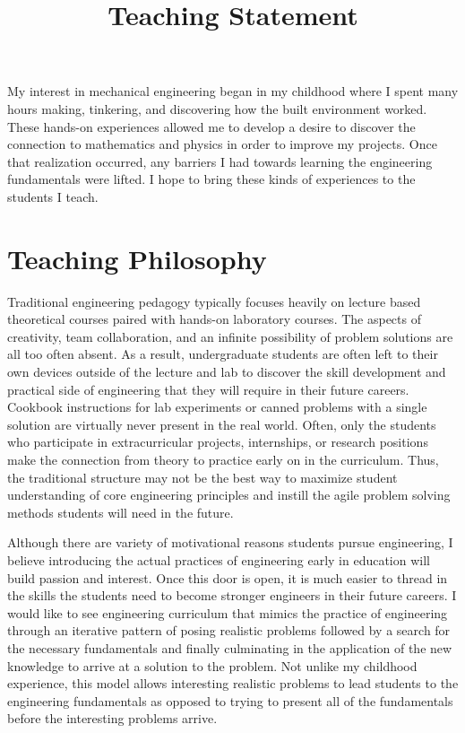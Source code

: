 \documentclass{article}
\title{Teaching Statement}
\date{}
\begin{document}
\maketitle

My interest in mechanical engineering began in my childhood where I spent many
hours making, tinkering, and discovering how the built environment worked.
These hands-on experiences allowed me to develop a desire to discover the
connection to mathematics and physics in order to improve my projects. Once
that realization occurred, any barriers I had towards learning the engineering
fundamentals were lifted. I hope to bring these kinds of experiences to the
students I teach.

\section*{Teaching Philosophy}
%
Traditional engineering pedagogy typically focuses heavily on lecture based
theoretical courses paired with hands-on laboratory courses. The aspects of
creativity, team collaboration, and an infinite possibility of problem
solutions are all too often absent. As a result, undergraduate students are
often left to their own devices outside of the lecture and lab to discover the
skill development and practical side of engineering that they will require in
their future careers. Cookbook instructions for lab experiments or canned
problems with a single  solution are virtually never present in the real world.
Often, only the students who participate in extracurricular projects,
internships, or research positions make the connection from theory to practice
early on in the curriculum. Thus, the traditional structure may not be the best
way to maximize student understanding of core engineering principles and
instill the agile problem solving methods students will need in the future.

Although there are variety of motivational reasons students pursue engineering,
I believe introducing the actual practices of engineering early in education
will build passion and interest. Once this door is open, it is much easier to
thread in the skills the students need to become stronger engineers in their
future careers. I would like to see engineering curriculum that mimics the
practice of engineering through an iterative pattern of posing realistic
problems followed by a search for the necessary fundamentals and finally
culminating in the application of the new knowledge to arrive at a solution to
the problem. Not unlike my childhood experience, this model allows interesting
realistic problems to lead students to the engineering fundamentals as opposed
to trying to present all of the fundamentals before the interesting problems
arrive.
\end{document}
